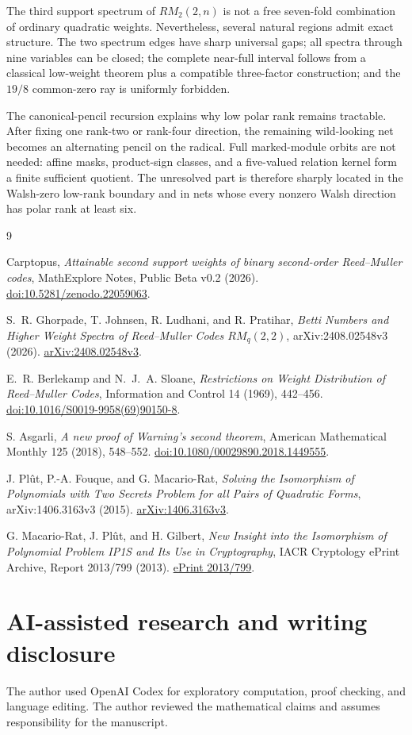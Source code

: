 \documentclass[11pt]{article}
\theoremstyle{remark}
\numberwithin{equation}{section}
\begin{document}
The third support spectrum of \(RM_2(2,n)\) is not a free seven-fold combination
of ordinary quadratic weights. Nevertheless, several natural regions admit
exact structure. The two spectrum edges have sharp universal gaps; all spectra
through nine variables can be closed; the complete near-full interval follows
from a classical low-weight theorem plus a compatible three-factor construction;
and the \(19/8\) common-zero ray is uniformly forbidden.

The canonical-pencil recursion explains why low polar rank remains tractable.
After fixing one rank-two or rank-four direction, the remaining wild-looking net
becomes an alternating pencil on the radical. Full marked-module orbits are not
needed: affine masks, product-sign classes, and a five-valued relation kernel
form a finite sufficient quotient. The unresolved part is therefore sharply
located in the Walsh-zero low-rank boundary and in nets whose every nonzero
Walsh direction has polar rank at least six.

\begin{thebibliography}{9}
\footnotesize
\raggedright

Carptopus,
\emph{Attainable second support weights of binary second-order Reed--Muller codes},
MathExplore Notes, Public Beta v0.2 (2026).
\href{https://doi.org/10.5281/zenodo.22059063}{doi:10.5281/zenodo.22059063}.

S.~R. Ghorpade, T. Johnsen, R. Ludhani, and R. Pratihar,
\emph{Betti Numbers and Higher Weight Spectra of Reed--Muller Codes $RM_q(2,2)$},
arXiv:2408.02548v3 (2026).
\href{https://arxiv.org/abs/2408.02548v3}{arXiv:2408.02548v3}.

E.~R. Berlekamp and N.~J.~A. Sloane,
\emph{Restrictions on Weight Distribution of Reed--Muller Codes},
Information and Control 14 (1969), 442--456.
\href{https://doi.org/10.1016/S0019-9958(69)90150-8}{doi:10.1016/S0019-9958(69)90150-8}.

S. Asgarli,
\emph{A new proof of Warning's second theorem},
American Mathematical Monthly 125 (2018), 548--552.
\href{https://doi.org/10.1080/00029890.2018.1449555}{doi:10.1080/00029890.2018.1449555}.

J. Pl\^ut, P.-A. Fouque, and G. Macario-Rat,
\emph{Solving the Isomorphism of Polynomials with Two Secrets Problem for all Pairs of Quadratic Forms},
arXiv:1406.3163v3 (2015).
\href{https://arxiv.org/abs/1406.3163v3}{arXiv:1406.3163v3}.

G. Macario-Rat, J. Pl\^ut, and H. Gilbert,
\emph{New Insight into the Isomorphism of Polynomial Problem IP1S and Its Use in Cryptography},
IACR Cryptology ePrint Archive, Report 2013/799 (2013).
\href{https://eprint.iacr.org/2013/799}{ePrint 2013/799}.

\end{thebibliography}

\section*{AI-assisted research and writing disclosure}

The author used OpenAI Codex for exploratory computation, proof checking, and
language editing. The author reviewed the mathematical claims and assumes
responsibility for the manuscript.
\end{document}
